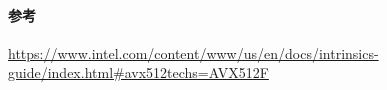 \paragraph{参考}

\url{https://www.intel.com/content/www/us/en/docs/intrinsics-guide/index.html#avx512techs=AVX512F}
